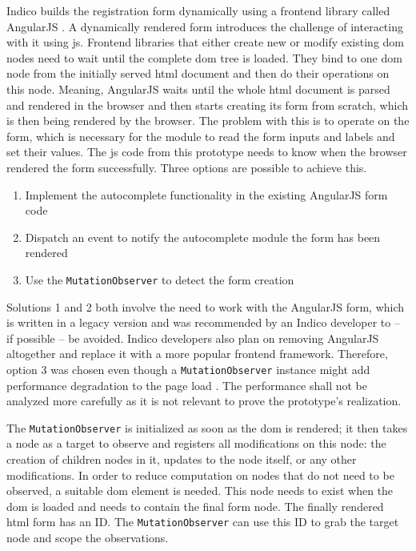 Indico builds the registration form dynamically using a frontend library called AngularJS \cite{angularjs}. A dynamically rendered form introduces the challenge of interacting with it using \gls{js}. Frontend libraries that either create new or modify existing \gls{dom} nodes need to wait until the complete \gls{dom} tree is loaded. They bind to one \gls{dom} node from the initially served \gls{html} document and then do their operations on this node. Meaning, AngularJS waits until the whole \gls{html} document is parsed and rendered in the browser and then starts creating its form from scratch, which is then being rendered by the browser. The problem with this is to operate on the form, which is necessary for the module to read the form inputs and labels and set their values. The \gls{js} code from this prototype needs to know when the browser rendered the form successfully. Three options are possible to achieve this.

\begin{enumerate}
    \item Implement the autocomplete functionality in the existing AngularJS form code
    \item Dispatch an event to notify the autocomplete module the form has been rendered
    \item Use the \texttt{MutationObserver} to detect the form creation
\end{enumerate}

Solutions 1 and 2 both involve the need to work with the AngularJS form, which is written in a legacy version and was recommended by an Indico developer to -- if possible -- be avoided. Indico developers also plan on removing AngularJS altogether and replace it with a more popular frontend framework. Therefore, option 3 was chosen even though a \texttt{MutationObserver} instance might add performance degradation to the page load \cite{dom-spec}. The performance shall not be analyzed more carefully as it is not relevant to prove the prototype's realization.

The \texttt{MutationObserver} is initialized as soon as the \gls{dom} is rendered; it then takes a node as a target to observe and registers all modifications on this node: the creation of children nodes in it, updates to the node itself, or any other modifications. In order to reduce computation on nodes that do not need to be observed, a suitable \gls{dom} element is needed. This node needs to exist when the \gls{dom} is loaded and needs to contain the final form node. The finally rendered \gls{html} form has an ID. The \texttt{MutationObserver} can use this ID to grab the target node and scope the observations.

